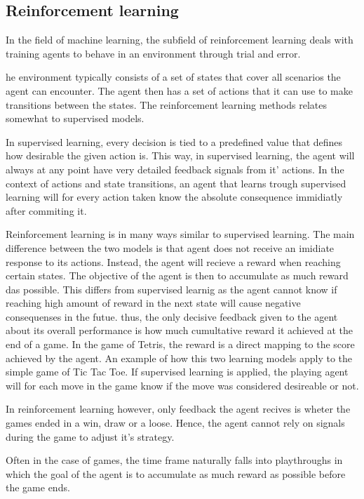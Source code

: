 \subsection{Reinforcement learning \label{RL}}

In the field of machine learning, the subfield of reinforcement learning
deals with training agents to behave in an environment through
trial and error. 

he environment typically consists of a set of states that cover all
scenarios the agent can encounter. The agent then has a set of actions
that it can use to make transitions between the states. 
The reinforcement learning methods relates somewhat 
to supervised models.


In supervised learning, every decision is tied to a predefined value
that defines how desirable the given action is. This way, in supervised learning,
the agent will always at any point have very detailed feedback signals from it' actions.
In the context of actions and state transitions, an agent that learns trough
supervised learning will for every action taken know the absolute consequence
immidiatly after commiting it.

Reinforcement learning is in many ways similar to supervised learning. 
The main difference between the two models is that agent does not receive 
an imidiate response to its actions. Instead, the agent will recieve a reward
when reaching certain states. The objective of the agent is then to
accumulate as much reward das possible. This differs from supervised learnig
as the agent cannot know if reaching high amount of reward in the next state
will cause negative consequenses in the futue. thus, the only decisive 
feedback given to the agent about its overall performance is 
how much cumultative reward it achieved at the end of a game.
In the game of Tetris, the reward is a direct mapping to 
the score achieved by the agent.
An example of how this two learning models apply to the simple game of
Tic Tac Toe. If supervised learning
is applied, the playing agent will for each move in the game know
if the move was considered desireable or not. 

In reinforcement learning however, only feedback the agent recives
is wheter the games ended in a win, draw or a loose. Hence, the agent
cannot rely on signals during the game to adjust it's strategy.


Often in the case of games, the 
time frame naturally falls into playthroughs in which the 
goal of the agent is to accumulate as much reward as possible 
before the game ends.

